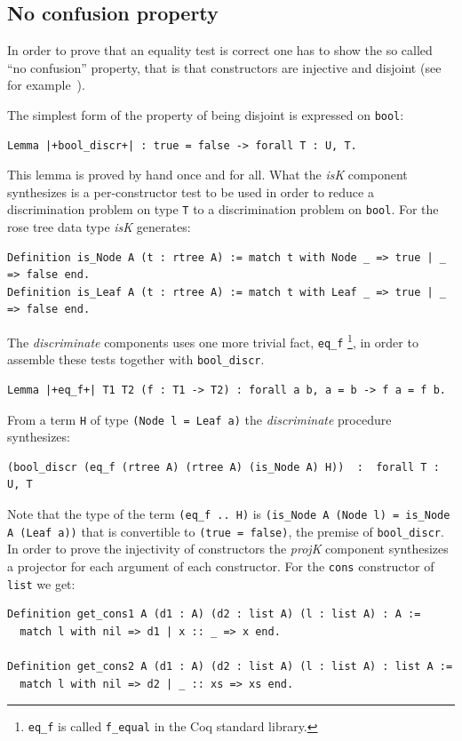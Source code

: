 \documentclass[a4paper,UKenglish,cleveref, autoref]{lipics-v2019}
\newcommand{\derive}[1]{\emph{#1}}
\begin{document}
\subsection{No confusion property} %

In order to prove that an equality test is correct
one has to show the so called ``no confusion'' property, that is that
constructors are injective and disjoint (see for
example~\cite{10.1007/11617990_12}).

The simplest form of the property of being disjoint is expressed on \lstinline+bool+:
\begin{lstlisting}
Lemma |+bool_discr+| : true = false -> forall T : U, T.
\end{lstlisting}

\noindent
This lemma is proved by hand once and for all. What the \derive{isK}
component synthesizes is a per-constructor test to be used in order
to reduce a discrimination problem on type \lstinline+T+ to a
discrimination problem on \lstinline+bool+. For the rose tree data
type \derive{isK} generates:
\begin{lstlisting}
Definition is_Node A (t : rtree A) := match t with Node _ => true | _ => false end.
Definition is_Leaf A (t : rtree A) := match t with Leaf _ => true | _ => false end.
\end{lstlisting}

\noindent
The \derive{discriminate} components uses one more trivial fact,
\lstinline+eq_f+
\footnote{\lstinline+eq_f+ is called \lstinline+f_equal+ in the Coq standard library.}, in order to assemble these tests together
with \lstinline+bool_discr+.
\begin{lstlisting}
Lemma |+eq_f+| T1 T2 (f : T1 -> T2) : forall a b, a = b -> f a = f b.
\end{lstlisting}

\noindent
From a term \lstinline+H+ of type 
\lstinline+(Node l = Leaf a)+ the \derive{discriminate} procedure
synthesizes:
\begin{lstlisting}
(bool_discr (eq_f (rtree A) (rtree A) (is_Node A) H))  :  forall T : U, T
\end{lstlisting}

\noindent
Note that the type of the term \lstinline+(eq_f .. H)+ is
\lstinline+(is_Node A (Node l) = is_Node A (Leaf a))+
that is convertible to \lstinline+(true = false)+, the premise of
\lstinline+bool_discr+.
\\

In order to prove the injectivity of constructors the \derive{projK}
component synthesizes a projector for each argument of each constructor.
For the \lstinline+cons+ constructor of \lstinline+list+ we get:
\begin{lstlisting}
Definition get_cons1 A (d1 : A) (d2 : list A) (l : list A) : A :=
  match l with nil => d1 | x :: _ => x end.

Definition get_cons2 A (d1 : A) (d2 : list A) (l : list A) : list A :=
  match l with nil => d2 | _ :: xs => xs end.
\end{lstlisting}
\end{document}
